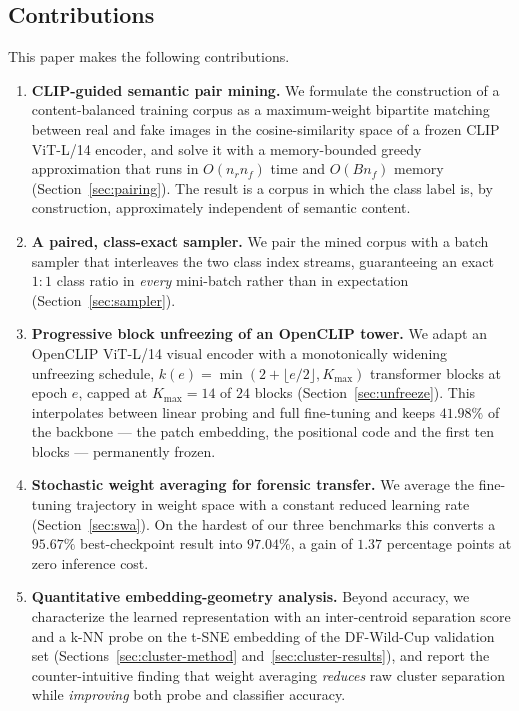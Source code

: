 \documentclass[10pt,journal]{IEEEtran}
\begin{document}
\subsection{Contributions}
This paper makes the following contributions.

\begin{enumerate}
\item \textbf{CLIP-guided semantic pair mining.} We formulate the construction
of a content-balanced training corpus as a maximum-weight bipartite matching
between real and fake images in the cosine-similarity space of a frozen CLIP
ViT-L/14 encoder, and solve it with a memory-bounded greedy approximation that
runs in $O(n_r n_f)$ time and $O(B n_f)$ memory (Section~\ref{sec:pairing}).
The result is a corpus in which the class label is, by construction,
approximately independent of semantic content.

\item \textbf{A paired, class-exact sampler.} We pair the mined corpus with a
batch sampler that interleaves the two class index streams, guaranteeing an
exact $1{:}1$ class ratio in \emph{every} mini-batch rather than in
expectation (Section~\ref{sec:sampler}).

\item \textbf{Progressive block unfreezing of an OpenCLIP tower.} We adapt an
OpenCLIP ViT-L/14 visual encoder with a monotonically widening unfreezing
schedule, $k(e)=\min(2+\lfloor e/2 \rfloor, K_{\max})$ transformer blocks at
epoch $e$, capped at $K_{\max}=14$ of $24$ blocks
(Section~\ref{sec:unfreeze}). This interpolates between linear probing and
full fine-tuning and keeps $41.98\%$ of the backbone --- the patch embedding,
the positional code and the first ten blocks --- permanently frozen.

\item \textbf{Stochastic weight averaging for forensic transfer.} We average
the fine-tuning trajectory in weight space with a constant reduced learning
rate (Section~\ref{sec:swa}). On the hardest of our three benchmarks this
converts a $95.67\%$ best-checkpoint result into $97.04\%$, a gain of $1.37$
percentage points at zero inference cost.

\item \textbf{Quantitative embedding-geometry analysis.} Beyond accuracy, we
characterize the learned representation with an inter-centroid separation
score and a k-NN probe on the t-SNE embedding of the DF-Wild-Cup validation
set (Sections~\ref{sec:cluster-method} and~\ref{sec:cluster-results}), and
report the counter-intuitive finding that weight averaging \emph{reduces}
raw cluster separation while \emph{improving} both probe and classifier
accuracy.


\end{enumerate}
\end{document}
